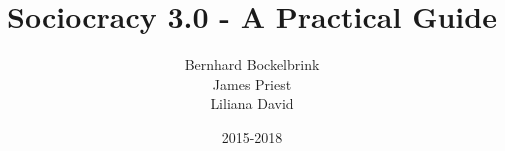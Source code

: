 \documentclass[a5paper]{scrreprt}
\begin{document}
	\title{Sociocracy 3.0 - A Practical Guide}
	\author{Bernhard Bockelbrink\\James Priest\\Liliana David}
	\date{2015-2018}
	\maketitle
	
	\setcounter{tocdepth}{0}
	\tableofcontents
	\setcounter{tocdepth}{1}
	\listoffigures
    
    
\end{document}
